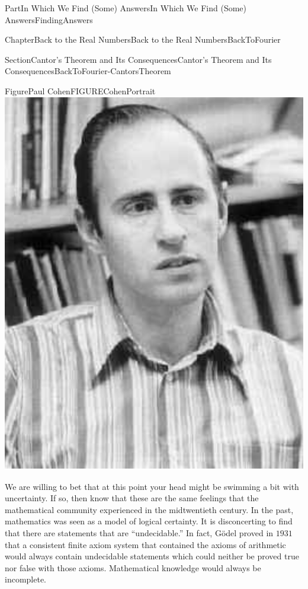 \documentclass[oneside,10pt,]{book}
\numberwithin{equation}{part}
\begin{document}
\begin{partptx}{Part}{In Which We Find (Some) Answers}{}{In Which We Find (Some) Answers}{}{}{FindingAnswers}
\begin{chapterptx}{Chapter}{Back to the Real Numbers}{}{Back to the Real Numbers}{}{}{BackToFourier}
\begin{sectionptx}{Section}{Cantor's Theorem and Its Consequences}{}{Cantor's Theorem and Its Consequences}{}{}{BackToFourier-CantorsTheorem}
\begin{sidebyside}{2}{0.075}{0.075}{0.15}
\begin{sbspanel}{0.35}
\begin{panelfigureptx}{Figure}{Paul Cohen}{FIGURECohenPortrait}{}
\noindent\includegraphics[width=\linewidth]{external/images/Cohen.png}
\tcblower
\end{panelfigureptx}%
\end{sbspanel}%
\end{sidebyside}%
We are willing to bet that at this point your head might be swimming a bit with uncertainty.  If so, then know that these are the same feelings that the mathematical community experienced in the mid\textendash{}twentieth century.  In the past, mathematics was seen as a model of logical certainty.  It is disconcerting to find that there are statements that are ``undecidable.'' In fact, Gödel proved in \(1931\) that a consistent finite axiom system that contained the axioms of arithmetic would always contain undecidable statements which could neither be proved true nor false with those axioms. Mathematical knowledge would always be incomplete.%
\par

\end{sectionptx}
\end{chapterptx}
\end{partptx}
\end{document}
